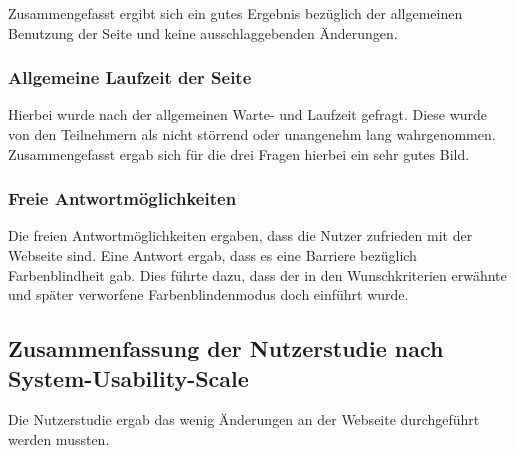 \noChanges

Zusammengefasst ergibt sich ein gutes Ergebnis bezüglich der allgemeinen Benutzung der Seite und keine ausschlaggebenden Änderungen.
\subsubsection{Allgemeine Laufzeit der Seite}
Hierbei wurde nach der allgemeinen Warte- und Laufzeit gefragt. Diese wurde von den Teilnehmern als nicht störrend oder unangenehm lang wahrgenommen.
Zusammengefasst ergab sich für die drei Fragen hierbei ein sehr gutes Bild. 

\subsubsection{Freie Antwortmöglichkeiten}
Die freien Antwortmöglichkeiten ergaben, dass die Nutzer zufrieden mit der Webseite sind. 
Eine Antwort ergab, dass es eine Barriere bezüglich Farbenblindheit gab.
Dies führte dazu, dass der in den Wunschkriterien erwähnte und später verworfene Farbenblindenmodus doch einführt wurde. 

\subsection{Zusammenfassung der Nutzerstudie nach System-Usability-Scale}

Die Nutzerstudie ergab das wenig Änderungen an der Webseite durchgeführt werden mussten.
